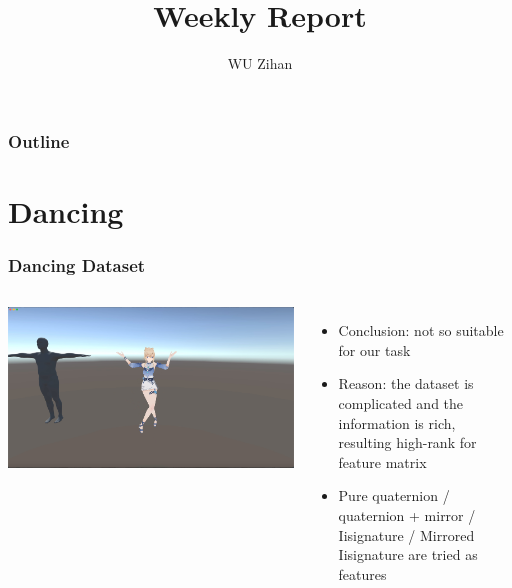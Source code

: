 \documentclass{beamer}
\title{Weekly Report}
\author{WU Zihan}
\begin{document}
\maketitle
\begin{frame}
    \frametitle{Outline}
    \tableofcontents
\end{frame}

\section{Dancing}
\begin{frame}
    \frametitle{Dancing Dataset}
    \begin{columns}
        \includegraphics[width=\textwidth]{dataset.jpg}
        \begin{itemize}
            \item Conclusion: not so suitable for our task
            \item Reason: the dataset is complicated and the information is rich, resulting high-rank for feature matrix
            \item Pure quaternion / quaternion + mirror / Iisignature / Mirrored Iisignature are tried as features
        \end{itemize}
    \end{columns}
\end{frame}
\end{document}
